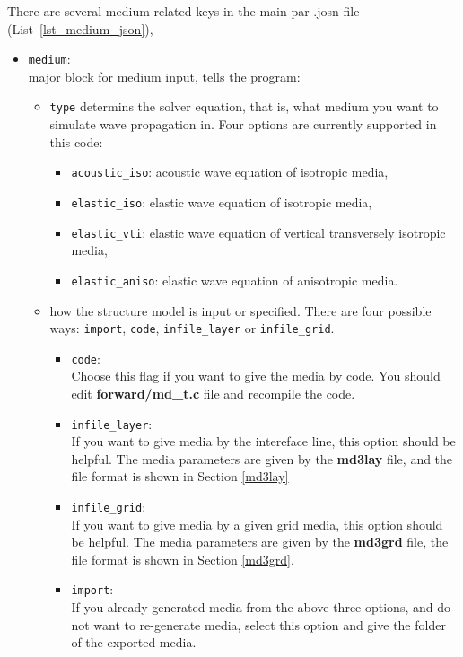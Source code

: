 There are several medium related keys in the main par .josn file (List~\ref{lst_medium_json}),
\begin{itemize}
\item \verb|medium|: \\
  major block for medium input, tells the program:
  \begin{itemize}

  \item \texttt{type} determins the solver equation, that is,
    what medium you want to simulate wave propagation in.
    Four options are currently supported in this code:
    \begin{itemize}
      \item \texttt{acoustic\_iso}: acoustic wave equation of isotropic media,
      \item \texttt{elastic\_iso}: elastic wave equation of isotropic media,
      \item \texttt{elastic\_vti}: elastic wave equation of vertical transversely isotropic media,
      \item \texttt{elastic\_aniso}: elastic wave equation of anisotropic media. 
    \end{itemize}

  \item how the structure model is input or specified.
    There are four possible ways:
    \texttt{import}, \texttt{code}, \texttt{infile\_layer} or \texttt{infile\_grid}.
    \begin{itemize}  
      \item \texttt{code}: \\
        Choose this flag if you want to give the media by code.
                 You should edit \textbf{forward/md\_t.c} file and recompile the code.
      \item \texttt{infile\_layer}: \\
        If you want to give media by the intereface line,
          this option should be helpful. The media parameters are given by the \textbf{md3lay} file,
          and the file format is shown in Section \ref{md3lay} 
      \item \texttt{infile\_grid}: \\
        If you want to give media by a given grid media,
          this option should be helpful. The media parameters are given by the \textbf{md3grd} file,
          the file format is shown in Section \ref{md3grd}.
      \item \texttt{import}: \\
        If you already generated media from the above three options,
        and do not want to re-generate media, 
        select this option and give the folder of the exported media. 
    \end{itemize}


\end{itemize}
\end{itemize}
